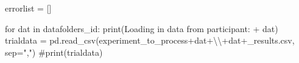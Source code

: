 \documentclass[
  letterpaper,
  DIV=11,
  numbers=noendperiod]{scrreprt}
\newenvironment{Shaded}{\begin{snugshade}}{\end{snugshade}}
\newcommand{\BuiltInTok}[1]{\textcolor[rgb]{0.00,0.23,0.31}{#1}}
\newcommand{\CharTok}[1]{\textcolor[rgb]{0.13,0.47,0.30}{#1}}
\newcommand{\CommentTok}[1]{\textcolor[rgb]{0.37,0.37,0.37}{#1}}
\newcommand{\ControlFlowTok}[1]{\textcolor[rgb]{0.00,0.23,0.31}{#1}}
\newcommand{\KeywordTok}[1]{\textcolor[rgb]{0.00,0.23,0.31}{#1}}
\newcommand{\NormalTok}[1]{\textcolor[rgb]{0.00,0.23,0.31}{#1}}
\newcommand{\OperatorTok}[1]{\textcolor[rgb]{0.37,0.37,0.37}{#1}}
\newcommand{\StringTok}[1]{\textcolor[rgb]{0.13,0.47,0.30}{#1}}
\begin{document}
\begin{Shaded}
\begin{Highlighting}[]
\NormalTok{errorlist }\OperatorTok{=}\NormalTok{ []}

\ControlFlowTok{for}\NormalTok{ dat }\KeywordTok{in}\NormalTok{ datafolders\_id:}
    \BuiltInTok{print}\NormalTok{(}\StringTok{\textquotesingle{}Loading in data from participant: \textquotesingle{}} \OperatorTok{+}\NormalTok{ dat)}
\NormalTok{    trialdata }\OperatorTok{=}\NormalTok{ pd.read\_csv(experiment\_to\_process}\OperatorTok{+}\NormalTok{dat}\OperatorTok{+}\StringTok{\textquotesingle{}}\CharTok{\textbackslash{}\textbackslash{}}\StringTok{\textquotesingle{}}\OperatorTok{+}\NormalTok{dat}\OperatorTok{+}\StringTok{\textquotesingle{}\_results.csv\textquotesingle{}}\NormalTok{, sep}\OperatorTok{=}\StringTok{","}\NormalTok{)}
    \CommentTok{\#print(trialdata)}
    

\end{Highlighting}
\end{Shaded}
\end{document}
